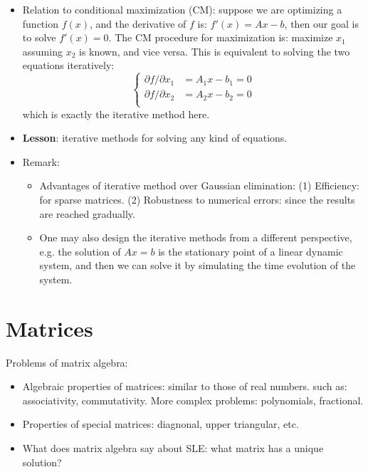 \documentclass{report}
\begin{document}
\begin{itemize}
\item Relation to conditional maximization (CM): suppose we are optimizing a function $f(x)$, and the derivative of $f$ is: $f'(x) = Ax - b$, then our goal is to solve $f'(x) = 0$. The CM procedure for maximization is: maximize $x_1$ assuming $x_2$ is known, and vice versa. This is equivalent to solving the two equations iteratively:
\begin{equation}
\left \{ \begin{array}{ll}
\partial f/\partial x_1 & = A_1 x - b_1 = 0\\
\partial f/\partial x_2 & = A_2 x - b_2 = 0\\
\end{array}
\right.	
\end{equation}
which is exactly the iterative method here. 

\item \textbf{Lesson}: iterative methods for solving any kind of equations. 

\item Remark:  
\begin{itemize}
\item Advantages of iterative method over Gaussian elimination: (1) Efficiency: for sparse matrices. (2) Robustness to numerical errors: since the results are reached gradually. 

\item One may also design the iterative methods from a different perspective, e.g. the solution of $Ax = b$ is the stationary point of a linear dynamic system, and then we can solve it by simulating the time evolution of the system. 
\end{itemize}
\end{itemize}
\section{Matrices}

Problems of matrix algebra: 
\begin{itemize}
\item Algebraic properties of matrices: similar to those of real numbers. such as: associativity, commutativity. More complex problems: polynomials, fractional. 

\item Properties of special matrices: diagnonal, upper triangular, etc. 

\item What does matrix algebra say about SLE: what matrix has a unique solution? 

\end{itemize}
\end{document}
